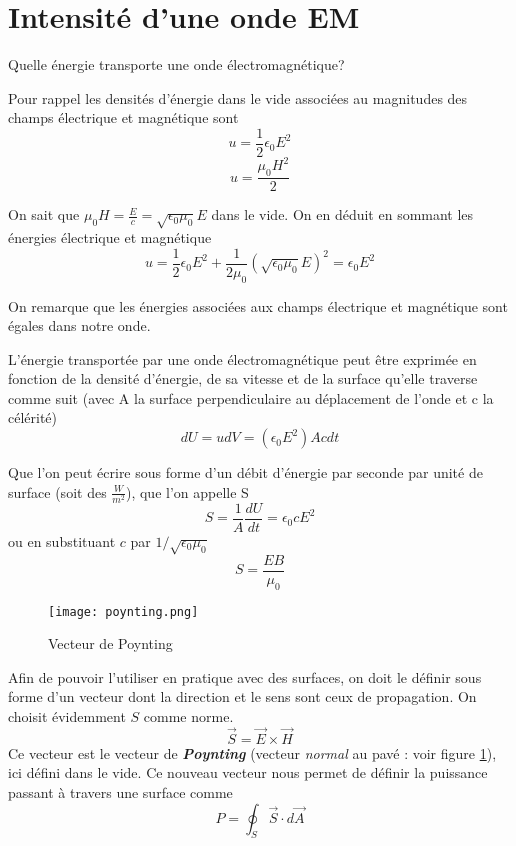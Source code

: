 \section{Intensité d'une onde EM}  %

Quelle énergie transporte une onde électromagnétique?

Pour rappel les densités d'énergie dans le vide associées au magnitudes des champs électrique et magnétique sont 
\[u=\frac{1}{2}\epsilon_0E^{2}\]
\[u=\frac{\mu_0H^{2}}{2}\]

On sait que $\mu_0H=\frac{E}{c}=\sqrt{ \epsilon_0 \mu_0 }E$ dans le vide. On en déduit en sommant les énergies électrique et magnétique
\[u=\frac{1}{2}\epsilon_0E^{2} + \frac{1}{2\mu_0}(\sqrt{ \epsilon_0 \mu_0 }E)^{2} = \epsilon_0E^{2}\]

On remarque que les énergies associées aux champs électrique et magnétique sont égales dans notre onde.

L'énergie transportée par une onde électromagnétique peut être exprimée en fonction de la densité d'énergie, de sa vitesse et de la surface qu'elle traverse comme suit (avec A la surface perpendiculaire au déplacement de l'onde et c la célérité)
\[dU=udV=(\epsilon_0E^{2})Ac dt\]

Que l'on peut écrire sous forme d'un débit d'énergie par seconde par unité de surface (soit des $\frac{W}{m^{2}}$), que l'on appelle S
\[S=\frac{1}{A}\frac{dU}{dt}=\epsilon_0cE^{2}\]
ou en substituant $c$ par $1/\sqrt{\epsilon_0 \mu_0}$
\[S=\frac{EB}{\mu_0}\]

\begin{figure}
	\centering
	\texttt{[image: poynting.png]}
	\caption{Vecteur de Poynting}
	\label{poynting}
\end{figure}

Afin de pouvoir l'utiliser en pratique avec des surfaces, on doit le définir sous forme d'un vecteur dont la direction et le sens sont ceux de propagation. On choisit évidemment $S$ comme norme.
\[\vec{S}=\vec{E} \times \vec{H} \]
Ce vecteur est le vecteur de \textit{\textbf{Poynting}} (vecteur \textit{normal} au pavé : voir figure \ref{poynting}), ici défini dans le vide.
Ce nouveau vecteur nous permet de définir la puissance passant à travers une surface comme
\[P=\oint_{S}\vec{S} \cdot d\vec{A}\] %


